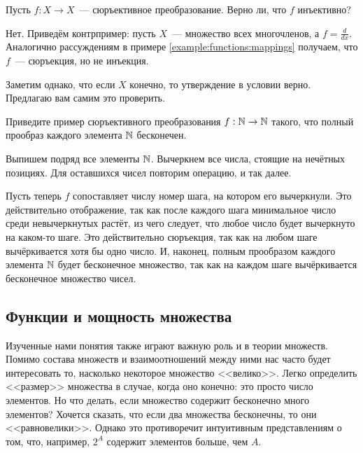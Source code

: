 \begin{Exercise}[counter=SecExercise]
    \noindent
    Пусть $ f: X \to X $~--- сюръективное преобразование.
    Верно ли, что $ f $ инъективно?
\end{Exercise}

\begin{Answer}
    \noindent
    Нет.
    Приведём контрпример: пусть $ X $~--- множество всех многочленов, а $ f = \frac{d}{dx} $.
    Аналогично рассуждениям в примере \ref{example:functions:mappings} получаем, что $ f $~--- сюръекция, но не инъекция.

    Заметим однако, что если $ X $ конечно, то утверждение в условии верно.
    Предлагаю вам самим это проверить.
\end{Answer}

\begin{Exercise}[counter=SecExercise, label={exercise:functions:infinite_surjection}]
    \noindent
    Приведите пример сюръективного преобразования $ f: \mathbb{N} \to \mathbb{N} $ такого, что полный прообраз каждого элемента $ \mathbb{N} $ бесконечен.
\end{Exercise}

\begin{Answer}
    \noindent
    Выпишем подряд все элементы $ \mathbb{N} $.
    Вычеркнем все числа, стоящие на нечётных позициях.
    Для оставшихся чисел повторим операцию, и так далее.

    Пусть теперь $ f $ сопоставляет числу номер шага, на котором его вычеркнули.
    Это действительно отображение, так как после каждого шага минимальное число среди невычеркнутых растёт,
    из чего следует, что любое число будет вычеркнуто на каком-то шаге.
    Это действительно сюръекция, так как на любом шаге вычёркивается хотя бы одно число.
    И, наконец, полным прообразом каждого элемента $ \mathbb{N} $ будет бесконечное множество,
    так как на каждом шаге вычёркивается бесконечное множество чисел.
\end{Answer}


\subsection{Функции и мощность множества}
\label{subsec:functions:cardinality}

Изученные нами понятия также играют важную роль и в теории множеств.
Помимо состава множеств и взаимоотношений между ними нас часто будет интересовать то, насколько некоторое множество <<велико>>.
Легко определить <<размер>> множества в случае, когда оно конечно: это просто число элементов.
Но что делать, если множество содержит бесконечно много элементов?
Хочется сказать, что если два множества бесконечны, то они <<равновелики>>.
Однако это противоречит интуитивным представлениям о том, что, например, $ 2^A $ содержит элементов больше, чем $ A $.

